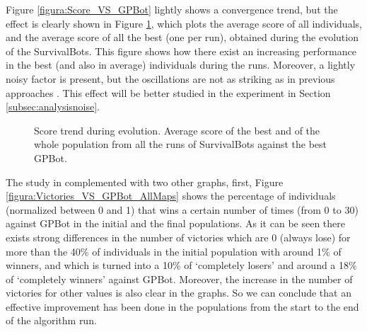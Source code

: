 \documentclass[conference]{IEEEtran}
\begin{document}

Figure \ref{figura:Score_VS_GPBot} lightly shows a convergence trend, but the effect is clearly shown in Figure \ref{figura:convergence}, which plots the average score of all individuals, and the average score of all the best (one per run), obtained during the evolution of the SurvivalBots.
This figure shows how there exist an increasing performance in the best (and also in average) individuals during the runs. Moreover, a lightly noisy factor is present, but the oscillations are not as striking as in previous approaches \cite{Genebot_JCST}.
This effect will be better studied in the experiment in Section \ref{subsec:analysisnoise}.

\begin{figure}[htb]
\tiny
\begin{center}
\end{center}
\caption{Score trend during evolution. Average score of the best and of the whole population from all the runs  of SurvivalBots against the best GPBot.}
\label{figura:convergence}
\end{figure}

The study in complemented with two other graphs, first, Figure \ref{figura:Victories_VS_GPBot_AllMaps} shows the percentage of individuals (normalized between 0 and 1) that wins a certain number of times (from 0 to 30) against GPBot in the initial and the final populations. As it can be seen there exists strong differences in the number of victories which are 0 (always lose) for more than the 40\% of individuals in the initial population with around 1\% of winners, and which is turned into a 10\% of `completely losers' and around a 18\% of `completely winners' against GPBot. Moreover, the increase in the number of victories for other values is also clear in the graphs.
So we can conclude that an effective improvement has been done in the populations from the start to the end of the algorithm run.
\end{document}
